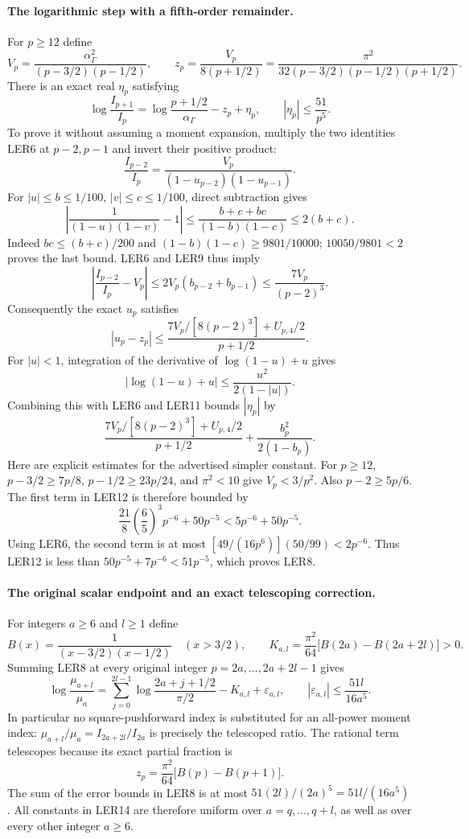 \paragraph{The logarithmic step with a fifth-order remainder.}
For $p\ge12$ define
\[
 V_p=\frac{\alpha_\Gamma^2}{(p-3/2)(p-1/2)},\qquad
 z_p=\frac{V_p}{8(p+1/2)}
     =\frac{\pi^2}{32(p-3/2)(p-1/2)(p+1/2)}.
 \tag{LER7}
\]
There is an exact real $\eta_p$ satisfying
\[
 \boxed{\displaystyle
 \log\frac{I_{p+1}}{I_p}
 =\log\frac{p+1/2}{\alpha_\Gamma}-z_p+\eta_p,
 \qquad |\eta_p|\le\frac{51}{p^5}.}
 \tag{LER8}
\]
To prove it without assuming a moment expansion, multiply the two
identities LER6 at $p-2,p-1$ and invert their positive product:
\[
 \frac{I_{p-2}}{I_p}
 =\frac{V_p}{(1-u_{p-2})(1-u_{p-1})}.
 \tag{LER9}
\]
For $|u|\le b\le1/100$, $|v|\le c\le1/100$, direct subtraction gives
\[
 \left|\frac1{(1-u)(1-v)}-1\right|
 \le\frac{b+c+bc}{(1-b)(1-c)}\le2(b+c).
\]
Indeed $bc\le(b+c)/200$ and $(1-b)(1-c)\ge9801/10000$;
$10050/9801<2$ proves the last bound. LER6 and LER9 thus imply
\[
 \left|\frac{I_{p-2}}{I_p}-V_p\right|
 \le2V_p(b_{p-2}+b_{p-1})\le\frac{7V_p}{(p-2)^3}.
 \tag{LER10}
\]
Consequently the exact $u_p$ satisfies
\[
 |u_p-z_p|\le
 \frac{7V_p/[8(p-2)^3]+U_{p,4}/2}{p+1/2}.
 \tag{LER11}
\]
For $|u|<1$, integration of the derivative of $\log(1-u)+u$ gives
\[
 |\log(1-u)+u|\le\frac{u^2}{2(1-|u|)}.
\]
Combining this with LER6 and LER11 bounds $|\eta_p|$ by
\[
 \frac{7V_p/[8(p-2)^3]+U_{p,4}/2}{p+1/2}
 +\frac{b_p^2}{2(1-b_p)}.
 \tag{LER12}
\]
Here are explicit estimates for the advertised simpler constant.
For $p\ge12$, $p-3/2\ge7p/8$, $p-1/2\ge23p/24$, and $\pi^2<10$
give $V_p<3/p^2$. Also $p-2\ge5p/6$. The first term in LER12 is
therefore bounded by
\[
 \frac{21}{8}\left(\frac65\right)^3p^{-6}+50p^{-5}
 <5p^{-6}+50p^{-5}.
\]
Using LER6, the second term is at most
$[49/(16p^6)](50/99)<2p^{-6}$.
Thus LER12 is less than
$50p^{-5}+7p^{-6}<51p^{-5}$, which proves LER8.

\paragraph{The original scalar endpoint and an exact telescoping correction.}
For integers $a\ge6$ and $l\ge1$ define
\[
 B(x)=\frac1{(x-3/2)(x-1/2)}\quad(x>3/2),\qquad
 K_{a,l}=\frac{\pi^2}{64}\bigl[B(2a)-B(2a+2l)\bigr]>0.
 \tag{LER13}
\]
Summing LER8 at every original integer $p=2a,\ldots,2a+2l-1$ gives
\[
 \boxed{\displaystyle
 \log\frac{\mu_{a+l}}{\mu_a}
 =\sum_{j=0}^{2l-1}\log\frac{2a+j+1/2}{\pi/2}
       -K_{a,l}+\varepsilon_{a,l},\qquad
 |\varepsilon_{a,l}|\le\frac{51l}{16a^5}.}
 \tag{LER14}
\]
In particular no square-pushforward index is substituted for an
all-power moment index: $\mu_{a+l}/\mu_a=I_{2a+2l}/I_{2a}$
is precisely the telescoped ratio. The rational term telescopes
because its exact partial fraction is
\[
 z_p=\frac{\pi^2}{64}\bigl[B(p)-B(p+1)\bigr].
 \tag{LER15}
\]
The sum of the error bounds in LER8 is at most
$51(2l)/(2a)^5=51l/(16a^5)$.
All constants in LER14 are therefore uniform over $a=q,\ldots,q+l$,
as well as over every other integer $a\ge6$.

